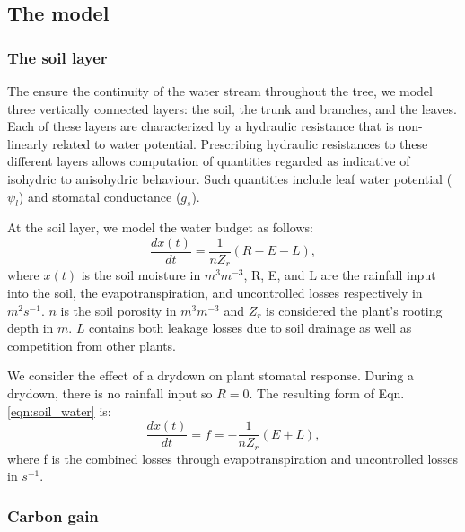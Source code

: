 \documentclass[utf8]{frontiersSCNS} %
\begin{document}
\subsection{The model}

\subsubsection{The soil layer}

The ensure the continuity of the water stream throughout the tree, we model three vertically connected layers: the soil, the trunk and branches, and the leaves. Each of these layers are characterized by a hydraulic resistance that is non-linearly related to water potential. Prescribing hydraulic resistances to these different layers allows computation of quantities regarded as indicative of isohydric to anisohydric behaviour. Such quantities include leaf water potential ($\psi_l$) and stomatal conductance ($g_s$).

At the soil layer, we model the water budget \citep{Rodriguez-Iturbe2007} as follows:
\begin{equation}
    \label{eqn:soil_water}
    \frac{dx(t)}{dt} =\frac{1}{n Z_r}(R - E - L),
\end{equation}
where $x(t)$ is the soil moisture in $m^3m^{-3}$, R, E, and L are the rainfall input into the soil, the evapotranspiration, and uncontrolled losses respectively in $m^2s^{-1}$. $n$ is the soil porosity in $m^3m^{-3}$ and $Z_r$ is considered the plant's rooting depth in $m$. $L$ contains both leakage losses due to soil drainage as well as competition from other plants.

We consider the effect of a drydown on plant stomatal response. During a drydown, there is no rainfall input so $R=0$. The resulting form of Eqn. \ref{eqn:soil_water} is:
\begin{equation}
    \label{eqn:soil_water_drydown}
    \frac{dx(t)}{dt} = f = - \frac{1}{n Z_r}(E + L),
\end{equation}
where f is the combined losses through evapotranspiration and uncontrolled losses in $s^{-1}$.

\subsubsection{Carbon gain}
\end{document}
